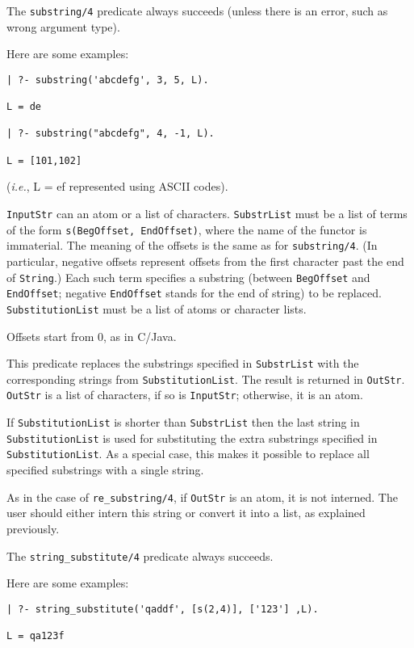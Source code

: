 \begin{description}
The \verb|substring/4| predicate always succeeds (unless there is an error,
such as wrong argument type).

Here are some examples: 
\begin{verbatim}
| ?- substring('abcdefg', 3, 5, L).

L = de

| ?- substring("abcdefg", 4, -1, L).

L = [101,102]
\end{verbatim}
({\it i.e.}, L = ef represented using ASCII codes).


{\tt InputStr} can an atom or a list of characters.  {\tt SubstrList} must
be a list of terms of the form {\tt s(BegOffset, EndOffset)}, where the
name of the functor is immaterial.  The meaning of the offsets is the same
as for {\tt substring/4}. (In particular, negative offsets represent
offsets from the first character past the end of {\tt String}.)  Each such
term specifies a substring (between {\tt BegOffset} and {\tt EndOffset};
negative {\tt EndOffset} stands for the end of string) to be replaced.
{\tt SubstitutionList} must be a list of atoms or character lists.

Offsets start from 0, as in C/Java.

This predicate replaces the substrings specified in {\tt SubstrList} with
the corresponding strings from {\tt SubstitutionList}.  The result is
returned in {\tt OutStr}. {\tt OutStr} is a list of characters, if so is
{\tt InputStr}; otherwise, it is an atom.

If {\tt SubstitutionList} is shorter than {\tt SubstrList} then the last
string in {\tt SubstitutionList} is used for substituting the extra
substrings specified in {\tt SubstitutionList}. As a special case, this
makes it possible to replace all specified substrings with a single string.

As in the case of {\tt re\_substring/4}, if {\tt OutStr} is an atom, it is
not interned.  The user should either intern this string or convert it into
a list, as explained previously.

The \verb|string_substitute/4| predicate always succeeds.

Here are some examples:
\begin{verbatim}
| ?- string_substitute('qaddf', [s(2,4)], ['123'] ,L).

L = qa123f


\end{verbatim}
\end{description}
